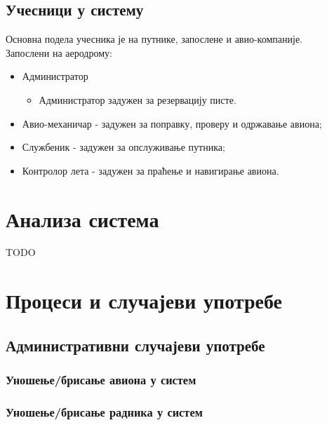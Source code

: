 \documentclass{article}
\begin{document}
\subsection{Учесници у систему}
Основна подела учесника је на путнике, запослене и авио-компаније.\\
Запослени на аеродрому:
\begin{itemize}
    \item Администратор
        \begin{itemize}
            \item Администратор задужен за резервацију писте.
        \end{itemize}
    \item Авио-механичар - задужен за поправку, проверу и одржавање авиона;
    \item Службеник - задужен за опслуживање путника;
    \item Контролор лета - задужен за праћење и навигирање авиона.
\end{itemize}

\section{Анализа система}

TODO

\section{Процеси и случајеви употребе}

\subsection{Административни случајеви употребе}

\subsubsection{Уношење/брисање авиона у систем}

\subsubsection{Уношење/брисање радника у систем}
\end{document}
